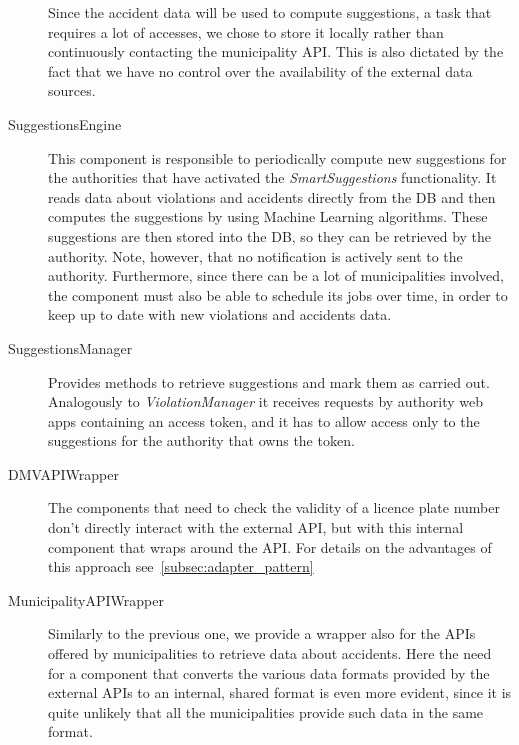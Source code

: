 \begin{description}
    Since the accident data will be used to compute suggestions, a task that
    requires a lot of accesses, we chose to store it locally rather than
    continuously contacting the municipality API. This is also dictated by
    the fact that we have no control over the availability of the external
    data sources.
    \item[SuggestionsEngine] This component is responsible to periodically
    compute new suggestions for the authorities that have activated the
    \emph{SmartSuggestions} functionality.
    It reads data about violations and accidents directly from the DB and
    then computes the suggestions by using Machine Learning algorithms.
    These suggestions are then stored into the DB, so they can be retrieved
    by the authority. Note, however, that no notification is actively sent to
    the authority.
    Furthermore, since there can be a lot of municipalities involved, the
    component must also be able to schedule its jobs over time, in order to
    keep up to date with new violations and accidents data.
    \item[SuggestionsManager] Provides methods to retrieve suggestions and
    mark them as carried out. Analogously to \emph{ViolationManager} it receives
    requests by authority web apps containing an access token, and it has to
    allow access only to the suggestions for the authority that owns the token.
    \item[DMVAPIWrapper] The components that need to check the validity of
    a licence plate number don't directly interact with the external API, but
    with this internal component that wraps around the API.
    For details on the advantages of this approach
    see~\ref{subsec:adapter_pattern}
    \item[MunicipalityAPIWrapper] Similarly to the previous one, we provide a
    wrapper also for the APIs offered by municipalities to retrieve data about
    accidents. Here the need for a component that converts the various data
    formats provided by the external APIs to an internal, shared format is
    even more evident, since it is quite unlikely that all the municipalities
    provide such data in the same format.
\end{description}